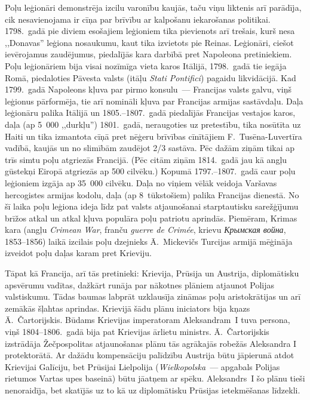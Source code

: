 \documentclass[twoside,a5paper,12pt,fleqn,openany]{extbook}
\newcommand{\pltxti}[1]{\textit{\textpolish{#1}}}
\newcommand{\rutxti}[1]{\textit{\textrussian{#1}}}
\newcommand{\frtxti}[1]{\textit{\textfrench{#1}}}
\newcommand{\entxti}[1]{\textit{\textenglish{#1}}}
\newcommand{\latxti}[1]{\textit{\textlatin{#1}}}
\begin{document}
Poļu leģionāri demonstrēja izcilu varonību kaujās, taču viņu liktenis arī parādīja, cik nesavienojama ir cīņa par brīvību ar kalpošanu iekarošanas politikai. 1798.~gadā pie diviem esošajiem leģioniem tika pievienots arī trešais, kurš nesa ,,Donavas'' leģiona nosaukumu, kaut tika izvietots pie Reinas. Leģionāri, ciešot ievērojamus zaudējumus, piedalījās kara darbībā pret Napoleona pretiniekiem. Poļu leģionāriem bija visai nozīmīga vieta karos Itālijā, 1798.~gadā tie iegāja Romā, piedaloties Pāvesta valsts (itāļu \latxti{Stati Pontifici}) pagaidu likvidācijā. Kad 1799.~gadā Napoleons kļuva par pirmo konsulu~--- Francijas valsts galvu, viņš leģionus pārformēja, tie arī nomināli kļuva par Francijas armijas sastāvdaļu. Daļa leģionāru palika Itālijā un 1805.--1807.~gadā piedalījās Francijas vestajos karos, daļa (ap 5~000 ,,durkļu'') 1801.~gadā, neraugoties uz pretestību, tika nosūtīta uz Haiti un tika izmantota cīņā pret nēģeru brīvības cīnītājiem F.~Tusēna-Luvertīra vadībā, kaujās un no slimībām zaudējot 2/3 sastāva. Pēc dažām ziņām tikai ap trīs simtu poļu atgriezās Francijā. (Pēc citām ziņām 1814.~gadā jau kā angļu gūstekņi Eiropā atgriezās ap 500 cilvēku.) Kopumā 1797.--1807.~gadā caur poļu leģioniem izgāja ap 35~000 cilvēku. Daļa no viņiem vēlāk veidoja Varšavas hercogistes armijas kodolu, daļa (ap 8~tūkstošiem) palika Francijas dienestā. No šī laika poļu leģiona ideja līdz pat valsts atjaunošanai starptautisku sarežģījumu brīžos atkal un atkal kļuva populāra poļu patriotu aprindās. Piemēram, Krimas kara (angļu \entxti{Crimean War}, franču \frtxti{guerre de Crimée}, krievu \rutxti{Крымская война}, 1853--1856) laikā izcilais poļu dzejnieks Ā.~Mickevičs Turcijas armijā mēģināja izveidot poļu daļas karam pret Krieviju.

Tāpat kā Francija, arī tās pretinieki: Krievija, Prūsija un Austrija, diplomātisku apsvērumu vadītas, dažkārt runāja par nākotnes plāniem atjaunot Polijas valstiskumu. Tādas baumas labprāt uzklausīja zināmas poļu aristokrātijas un arī zemākās šļahtas aprindas. Krievijā šādu plānu iniciators bija kņazs Ā.~Čartorijskis. Būdams Krievijas imperatoram Aleksandram~I tuva persona, viņš 1804--1806.~gadā bija pat Krievijas ārlietu ministrs. Ā.~Čartorijskis izstrādāja Žečpospolitas atjaunošanas plānu tās agrākajās robežās Aleksandra I protektorātā. Ar dažādu kompensāciju palīdzību Austrija būtu jāpierunā atdot Krievijai Galīciju, bet Prūsijai Lielpolija (\pltxti{Wielkopolska}~--- apgabals Polijas rietumos Vartas upes baseinā) būtu jāatņem ar spēku. Aleksandrs~I šo plānu tieši nenoraidīja, bet skatījās uz to kā uz diplomātisku Prūsijas ietekmēšanas līdzekli.
\end{document}
